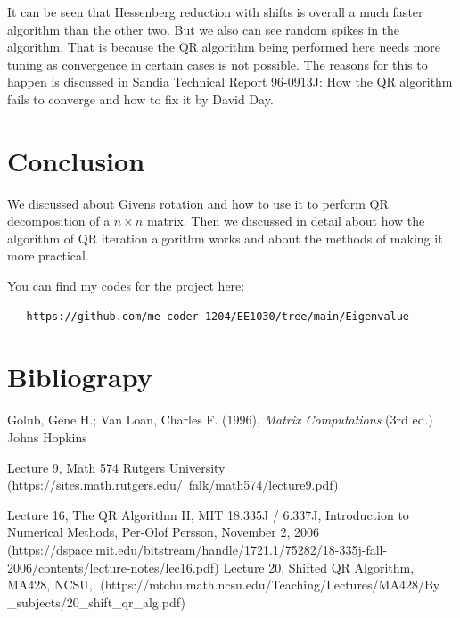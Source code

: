 \documentclass[journal]{IEEEtran}
\numberwithin{equation}{section}
\begin{document}
It can be seen that Hessenberg reduction with shifts is overall a much faster algorithm than the other two. But we also can see random spikes in the algorithm. 
That is because the QR algorithm being performed here needs more tuning as convergence in certain cases is not possible.
The reasons for this to happen is discussed in Sandia Technical Report 96-0913J: How the QR algorithm fails to converge and how to fix it by David Day.

\section{Conclusion}

We discussed about Givens rotation and how to use it to perform QR decomposition of a $n \times n$ matrix. Then we discussed in detail about how the algorithm of QR iteration algorithm works and about the methods of making it more practical. 

You can find my codes for the project here:
\begin{lstlisting}
   https://github.com/me-coder-1204/EE1030/tree/main/Eigenvalue 
\end{lstlisting}

\section{Bibliograpy}

\begin{thebibliography}{9}
    Golub, Gene H.; Van Loan, Charles F. (1996), \textit{Matrix Computations} (3rd ed.) Johns Hopkins 

    Lecture 9, Math 574 Rutgers University (https://sites.math.rutgers.edu/~falk/math574/lecture9.pdf)

    Lecture 16, The QR Algorithm II, MIT 18.335J / 6.337J, Introduction to Numerical Methods, Per-Olof Persson, November 2, 2006 (https://dspace.mit.edu/bitstream/handle/1721.1/75282/18-335j-fall-2006/contents/lecture-notes/lec16.pdf)
    Lecture 20, Shifted QR Algorithm, MA428, NCSU,. (https://mtchu.math.ncsu.edu/Teaching/Lectures/MA428/By\\\_subjects/20\_shift\_qr\_alg.pdf)
\end{thebibliography}
\end{document}
